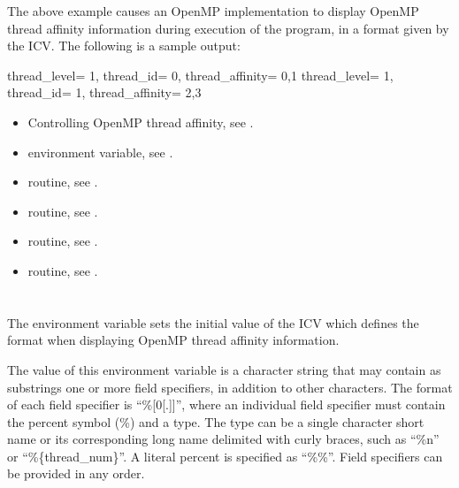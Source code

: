 The above example causes an OpenMP implementation to display OpenMP thread affinity information during execution of
the program, in a format given by the  ICV.  The following is a sample output:
\begin{boxedcode}
thread_level=   1,   thread_id=   0,   thread_affinity=    0,1  
thread_level=   1,   thread_id=   1,   thread_affinity=    2,3
\end{boxedcode}

\crossreferences
\begin{itemize}

\item Controlling OpenMP thread affinity, see 
. 
\item {} environment variable, see 
.
\item {} routine, see .
\item {} routine, see .
\item {} routine, see .
\item {} routine, see .
\end{itemize}


\section{}
\label{sec:OMP_AFFINITY_FORMAT}

The  environment variable sets the initial value of the 
 ICV which defines the format when displaying OpenMP
thread affinity information.


The value of this environment variable is a character string that may contain as
substrings one or more field specifiers, in addition to other characters.
The format of each field specifier is “\%[0[.]]”,
where an individual field specifier must contain the percent symbol (\%) and a type. 
The type can be a single character short name or its corresponding long name delimited with curly braces,
 such as “\%n” or “\%\{thread\_num\}”.
A literal percent is specified as “\%\%”.  Field specifiers can be provided in any order.

